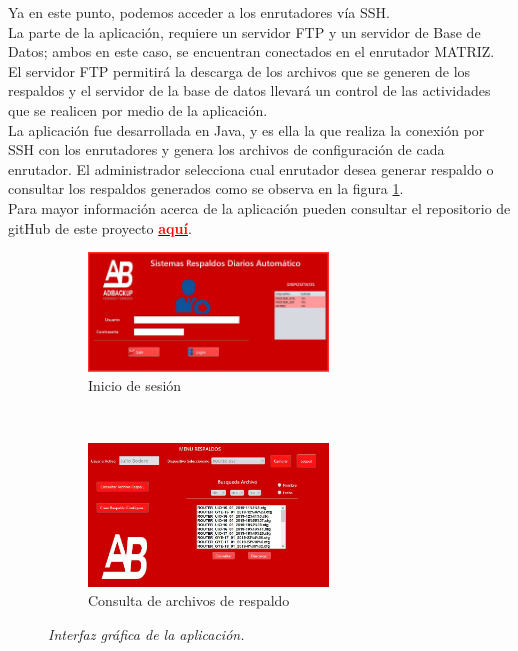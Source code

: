 \documentclass[conference]{IEEEtran}
\begin{document}
Ya en este punto, podemos acceder a los enrutadores vía SSH.\\
La parte de la aplicación, requiere un servidor FTP y un servidor de Base de Datos; ambos en este caso, se encuentran conectados en el enrutador MATRIZ. El servidor FTP permitirá la descarga de los archivos que se generen de los respaldos y el servidor de la base de datos llevará un control de las actividades que se realicen por medio de la aplicación.\\
La aplicación fue desarrollada en Java, y es ella la que realiza la conexión por SSH con los enrutadores y genera los archivos de configuración de cada enrutador. El administrador selecciona cual enrutador desea generar respaldo o consultar los respaldos generados como se observa en la figura \ref{fig:ap01}.\\
Para mayor información acerca de la aplicación pueden consultar el repositorio de gitHub de este proyecto \href{https://github.com/jcbodero/2T2018_PROYECTO_SistemaDeRespaldosDiariosAutomaticos_GRUPO1}{\textcolor{red}{\textbf{aquí}}}.
\begin{figure}[h]
    \begin{subfigure}[h]{0.5\textwidth}
       \centerline{\includegraphics[width=0.7\textwidth]{img/ap01.jpg}}
        \caption{Inicio de sesión}

    \end{subfigure}
    ~ %
     \begin{subfigure}[h]{0.5\textwidth}
        \centerline{\includegraphics[width=0.7\textwidth]{img/ap02.jpg}}
        \caption{Consulta de archivos de respaldo}

    \end{subfigure}
    \caption{\textit{Interfaz gráfica de la aplicación.}}
\label{fig:ap01}
\end{figure}
\end{document}
